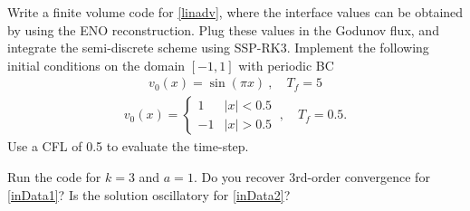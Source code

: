 \documentclass{article}
\begin{document}
\begin{exerciseList}
\item Write a finite volume code for \eqref{linadv}, where the interface values can be obtained by using the ENO reconstruction. Plug these values in the Godunov flux, and integrate the semi-discrete scheme using SSP-RK3. Implement the following initial conditions on the domain $[-1,1]$ with periodic BC
\begin{gather} \label{inData1}
	v_0(x)=\sin(\pi x)\ ,  
	\quad
	T_f = 5
\end{gather}%
\begin{gather} \label{inData2}
	v_0(x)=\begin{cases}
		1 & |x|<0.5\\
		-1 & |x|>0.5
	\end{cases}\ ,
	\quad
	T_f = 0.5.
\end{gather}%
Use a CFL of 0.5 to evaluate the time-step. 

\item
Run the code for $k=3$ and $a=1$. Do you recover 3rd-order convergence for \eqref{inData1}? Is the solution oscillatory for \eqref{inData2}?



\end{exerciseList}
\end{document}
